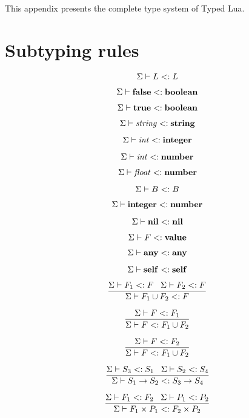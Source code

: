 This appendix presents the complete type system of Typed Lua.

\section{Subtyping rules}

\noindent

\[
\Sigma \vdash L <: L
\]

\[
\Sigma \vdash \mathbf{false} <: \mathbf{boolean}
\]

\[
\Sigma \vdash \mathbf{true} <: \mathbf{boolean}
\]

\[
\Sigma \vdash {\it string} <: \mathbf{string}
\]

\[
\Sigma \vdash {\it int} <: \mathbf{integer}
\]

\[
\Sigma \vdash {\it int} <: \mathbf{number}
\]

\[
\Sigma \vdash {\it float} <: \mathbf{number}
\]

\[
\Sigma \vdash B <: B
\]

\[
\Sigma \vdash \mathbf{integer} <: \mathbf{number}
\]

\[
\Sigma \vdash \mathbf{nil} <: \mathbf{nil}
\]

\[
\Sigma \vdash F <: \mathbf{value}
\]

\[
\Sigma \vdash \mathbf{any} <: \mathbf{any}
\]

\[
\Sigma \vdash \mathbf{self} <: \mathbf{self}
\]

\[
\dfrac{\Sigma \vdash F_{1} <: F \;\;\;
       \Sigma \vdash F_{2} <: F}
      {\Sigma \vdash F_{1} \cup F_{2} <: F}
\]

\[
\dfrac{\Sigma \vdash F <: F_{1}}
      {\Sigma \vdash F <: F_{1} \cup F_{2}}
\]

\[
\dfrac{\Sigma \vdash F <: F_{2}}
      {\Sigma \vdash F <: F_{1} \cup F_{2}}
\]

\[
\dfrac{\Sigma \vdash S_{3} <: S_{1} \;\;\;
       \Sigma \vdash S_{2} <: S_{4}}
      {\Sigma \vdash S_{1} \rightarrow S_{2} <: S_{3} \rightarrow S_{4}}
\]

\[
\dfrac{\Sigma \vdash F_{1} <: F_{2} \;\;\;
       \Sigma \vdash P_{1} <: P_{2}}
      {\Sigma \vdash F_{1} \times P_{1} <: F_{2} \times P_{2}}
\]

